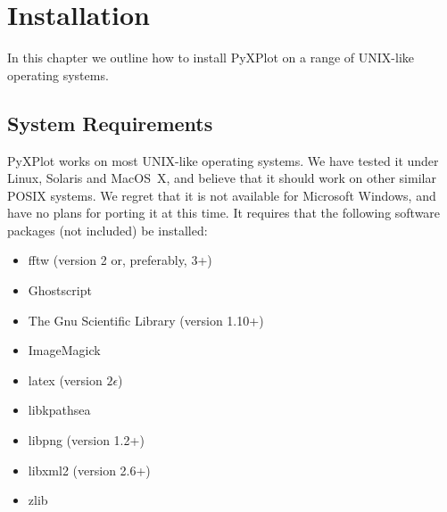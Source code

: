 %
%
%
%
%



\chapter{Installation}

\label{ch:installation}

In this chapter we outline how to install PyXPlot on a range of UNIX-like
operating systems.

\section{System Requirements}

PyXPlot works on most UNIX-like operating systems. We have tested it under
Linux, Solaris and MacOS~X, and believe that it
should work on other similar POSIX systems. We regret that it is not available
for Microsoft Windows, and have no plans for porting it at this time. It
requires that the following software packages (not included) be
installed:

\vspace{0.5cm}
\begin{itemize}
\item fftw (version 2 or, preferably, 3+) 
\item Ghostscript 
\item The Gnu Scientific Library (version 1.10+) 
\item ImageMagick 
\item latex (version $2\epsilon$) 
\item libkpathsea 
\item libpng (version 1.2+) 
\item libxml2 (version 2.6+) 
\item zlib 
\end{itemize}
\vspace{0.5cm}

